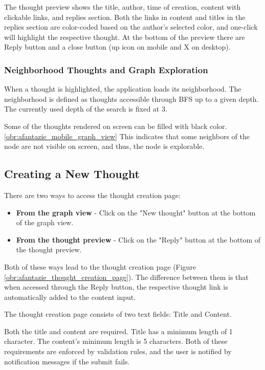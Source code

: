 The thought preview shows the title, author, time of creation, content with clickable links, and replies section.
Both the links in content and titles in the replies section are color-coded based on the author's selected color, and one-click will highlight the respective thought.
At the bottom of the preview there are Reply button and a close button (up icon on mobile and X on desktop).

\subsubsection*{Neighborhood Thoughts and Graph Exploration}

When a thought is highlighted, the application loads its neighborhood.
The neighborhood is defined as thoughts accessible through \gls{BFS} up to a given depth.
The currently used depth of the search is fixed at 3.

Some of the thoughts rendered on screen can be filled with black color. \ref{obr:afantazie_mobile_graph_view}
This indicates that some neighbors of the node are not visible on screen, and thus, the node is explorable.
  
\subsection{Creating a New Thought}

There are two ways to access the thought creation page:
\begin{itemize}
  \item \textbf{From the graph view} - Click on the "New thought" button at the bottom of the graph view.
  \item \textbf{From the thought preview} - Click on the "Reply" button at the bottom of the thought preview.
\end{itemize}

Both of these ways lead to the thought creation page (Figure \ref{obr:afantazie_thought_creation_page}).
The difference between them is that when accessed through the Reply button, the respective thought link
is automatically added to the content input.

The thought creation page consists of two text fields: Title and Content.

Both the title and content are required. Title has a minimum length of 1 character. The content's minimum length is 5 characters.
Both of these requirements are enforced by validation rules, and the user is notified by notification messages if the submit fails.

